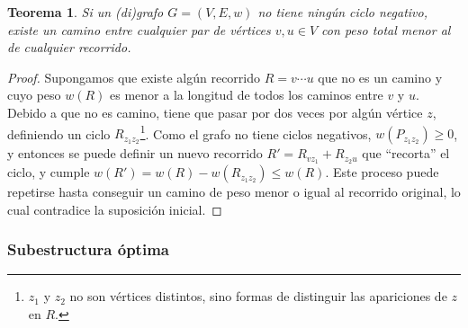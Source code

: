 \documentclass[a4paper]{report}
\newtheorem*{theorem*}{Teorema}
\begin{document}
\label{teorema-ciclos-negativos}
\begin{theorem*}
    Si un (di)grafo $G = (V, E, w)$ no tiene ningún ciclo negativo, existe un camino entre cualquier par de vértices $v, u \in V$ con peso total menor al de cualquier recorrido.
\end{theorem*}
\begin{proof}
    Supongamos que existe algún recorrido $R = v \cdots u$ que no es un camino y cuyo peso $w(R)$ es menor a la longitud de todos los caminos entre $v$ y $u$. Debido a que no es camino, tiene que pasar por dos veces por algún vértice $z$, definiendo un ciclo $R_{z_1 z_2}$\footnote{$z_1$ y $z_2$ no son vértices distintos, sino formas de distinguir las apariciones de $z$ en $R$.}. Como el grafo no tiene ciclos negativos, $w(P_{z_1 z_2}) \geq 0$, y entonces se puede definir un nuevo recorrido $R' = R_{v z_1} + R_{z_2 u}$ que ``recorta'' el ciclo, y cumple $w(R') = w(R) - w(R_{z_1 z_2}) \leq w(R)$. Este proceso puede repetirse hasta conseguir un camino de peso menor o igual al recorrido original, lo cual contradice la suposición inicial.
\end{proof}

\subsubsection{Subestructura óptima}
\end{document}

